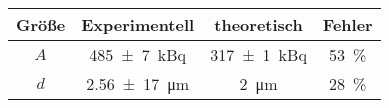 \label{tab:tabFehler}
	\begin{tabular}{cccc}
		\toprule
		{Größe}&{Experimentell}&{theoretisch}&{Fehler}\\
		\midrule
		$A$ & \SI{485(7)}{\kilo\becquerel} & \SI{317(1)}{\kilo\becquerel}  & \SI{53}{\%} \\
		$d$ & \SI{2,56(17)}{\micro\meter} & \SI{2}{\micro\meter} & \SI{28}{\%}\\
		\bottomrule
	\end{tabular}
